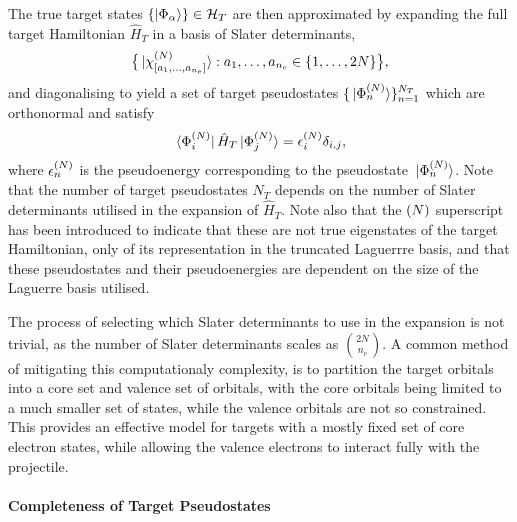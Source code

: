 \documentclass[]{article}
\begin{document}
The true target states
$\lbrace\ket{\Phi_{\alpha}}\rbrace \in \mathcal{H}_{T}$ are then
approximated by expanding the full target Hamiltonian $\hat{H}_{T}$ in a basis
of Slater determinants,
\begin{equation}
  \label{eq:target-slater-determinant-basis}
  \lrset[\big]
  {
    \ket*{\chi_{\lrsq{a_{1}, \dotsc, a_{n_{\mathrm{e}}}}}^{\lr{N}}}
    :
    a_{1}, \dotsc, a_{n_{\mathrm{e}}}
    \in
    \lrset{1, \dotsc, 2N}
  }
  ,
\end{equation}
and diagonalising to yield a set of target pseudostates
$\lbrace\ket*{\Phi_{n}^{(N)}}\rbrace_{n = 1}^{N_{T}}$ which are orthonormal and
satisfy
\begin{equation}
  \label{eq:target-states}
  \bra*{\Phi_{i}^{\lr{N}}}
  \hat{H}_{T}
  \ket*{\Phi_{j}^{\lr{N}}}
  =
  \epsilon_{i}^{\lr{N}}
  \delta_{i, j}
  ,
\end{equation}
where $\epsilon_{n}^{(N)}$ is the pseudoenergy corresponding to the
pseudostate $\ket*{\Phi_{n}^{(N)}}$.
Note that the number of target pseudostates $N_{T}$ depends on the number of
Slater determinants utilised in the expansion of $\hat{H}_{T}$.
Note also that the $(N)$ superscript has been introduced to indicate that
these are not true eigenstates of the target Hamiltonian, only of its
representation in the truncated Laguerrre basis, and that these pseudostates and
their pseudoenergies are dependent on the size of the Laguerre basis utilised.

The process of selecting which Slater determinants to use in the expansion is
not trivial, as the number of Slater determinants scales as
$\binom{2N}{n_{\mathrm{e}}}$.
A common method of mitigating this computationaly complexity, is to partition
the target orbitals into a core set and valence set of orbitals, with the core
orbitals being limited to a much smaller set of states, while the valence
orbitals are not so constrained.
This provides an effective model for targets with a mostly fixed set of core
electron states, while allowing the valence electrons to interact fully with the
projectile.

\paragraph{Completeness of Target Pseudostates}
\label{sec:th-ccc-target-compl}
\end{document}
